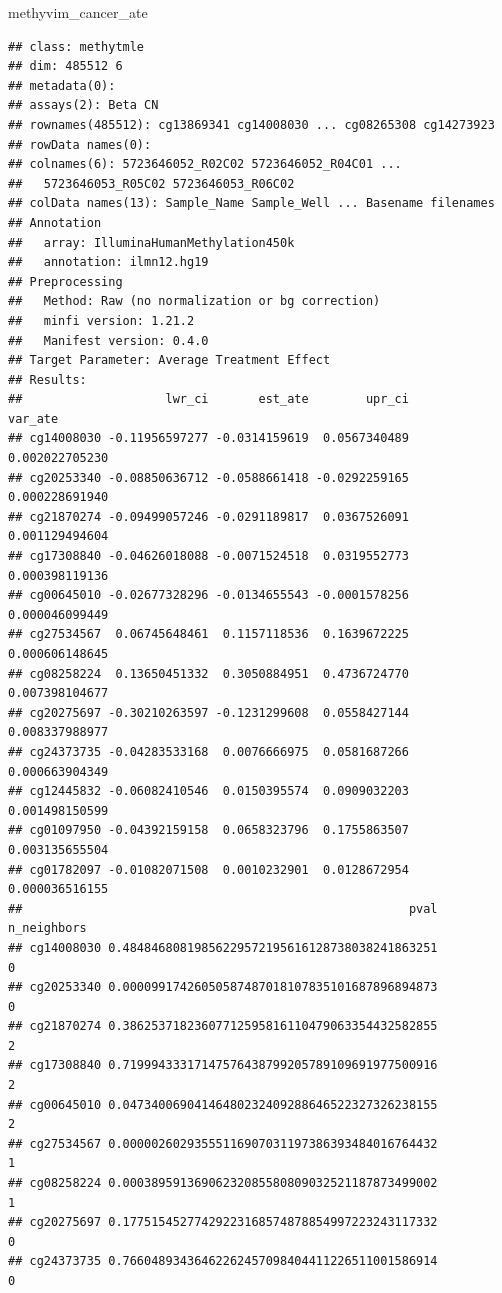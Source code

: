 \documentclass[9pt,a4paper,]{extarticle}
\newenvironment{Shaded}{\begin{snugshade}}{\end{snugshade}}
\newcommand{\NormalTok}[1]{#1}
\theoremstyle{definition}
\theoremstyle{definition}
\theoremstyle{definition}
\theoremstyle{remark}
\begin{document}
\begin{Shaded}
\begin{Highlighting}[]
\NormalTok{methyvim_cancer_ate}
\end{Highlighting}
\end{Shaded}

\begin{verbatim}
## class: methytmle 
## dim: 485512 6 
## metadata(0):
## assays(2): Beta CN
## rownames(485512): cg13869341 cg14008030 ... cg08265308 cg14273923
## rowData names(0):
## colnames(6): 5723646052_R02C02 5723646052_R04C01 ...
##   5723646053_R05C02 5723646053_R06C02
## colData names(13): Sample_Name Sample_Well ... Basename filenames
## Annotation
##   array: IlluminaHumanMethylation450k
##   annotation: ilmn12.hg19
## Preprocessing
##   Method: Raw (no normalization or bg correction)
##   minfi version: 1.21.2
##   Manifest version: 0.4.0
## Target Parameter: Average Treatment Effect
## Results: 
##                    lwr_ci       est_ate        upr_ci        var_ate
## cg14008030 -0.11956597277 -0.0314159619  0.0567340489 0.002022705230
## cg20253340 -0.08850636712 -0.0588661418 -0.0292259165 0.000228691940
## cg21870274 -0.09499057246 -0.0291189817  0.0367526091 0.001129494604
## cg17308840 -0.04626018088 -0.0071524518  0.0319552773 0.000398119136
## cg00645010 -0.02677328296 -0.0134655543 -0.0001578256 0.000046099449
## cg27534567  0.06745648461  0.1157118536  0.1639672225 0.000606148645
## cg08258224  0.13650451332  0.3050884951  0.4736724770 0.007398104677
## cg20275697 -0.30210263597 -0.1231299608  0.0558427144 0.008337988977
## cg24373735 -0.04283533168  0.0076666975  0.0581687266 0.000663904349
## cg12445832 -0.06082410546  0.0150395574  0.0909032203 0.001498150599
## cg01097950 -0.04392159158  0.0658323796  0.1755863507 0.003135655504
## cg01782097 -0.01082071508  0.0010232901  0.0128672954 0.000036516155
##                                                      pval n_neighbors
## cg14008030 0.48484680819856229572195616128738038241863251           0
## cg20253340 0.00009917426050587487018107835101687896894873           0
## cg21870274 0.38625371823607712595816110479063354432582855           2
## cg17308840 0.71999433317147576438799205789109691977500916           2
## cg00645010 0.04734006904146480232409288646522327326238155           2
## cg27534567 0.00000260293555116907031197386393484016764432           1
## cg08258224 0.00038959136906232085580809032521187873499002           1
## cg20275697 0.17751545277429223168574878854997223243117332           0
## cg24373735 0.76604893436462262457098404411226511001586914           0

\end{verbatim}
\end{document}
